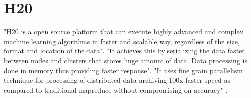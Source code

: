 \section{H20}


"H20 is a open source platform that can execute highly advanced and complex machine learning algorithms in faster and scalable way,
regardless of the size, format and location of the data"\cite{www-h2o}.
"It achieves this by serializing the data faster between nodes and clusters that stores huge amount of data. Data processing is done 
in memory thus providing faster response"\cite{www-h2o}.
"It uses fine grain parallelism technique for processing of distributed data archiving 100x faster speed as compared to 
traditional mapreduce without compromising on accuracy" \cite{www-h2o}.



